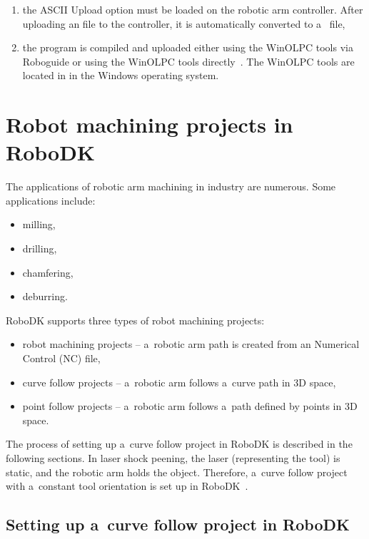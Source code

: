\begin{enumerate}
\item the ASCII Upload option must be loaded on the robotic arm controller. After uploading an  file to the controller, it is automatically converted to a~ file,
\item the program is compiled and uploaded either using the WinOLPC  tools via Roboguide or using the WinOLPC tools directly~\cite{fanuchandling}. The WinOLPC tools are located in  in the Windows operating system.

\end{enumerate}

\section{Robot machining projects in RoboDK}

The applications of robotic arm machining in industry are numerous. Some applications include:

\begin{itemize}

    \item milling,
    \item drilling,
    \item chamfering,
    \item deburring.

\end{itemize}
RoboDK supports three types of robot machining projects:

\begin{itemize}

    \item robot machining projects -- a~robotic arm path is created from an Numerical Control (NC) file,
    \item curve follow projects -- a~robotic arm follows a~curve path in 3D space, 
    \item point follow projects -- a~robotic arm follows a~path defined by points in 3D space.

\end{itemize}
The process of setting up a~curve follow project in RoboDK is described in the following sections. In laser shock peening, the laser (representing the tool) is static, and the robotic arm holds the object. Therefore, a~curve follow project with a~constant tool orientation is set up in RoboDK~\cite{machiningproject}.

\subsection{Setting up a~curve follow project in RoboDK}
\label{sec:settingup}

